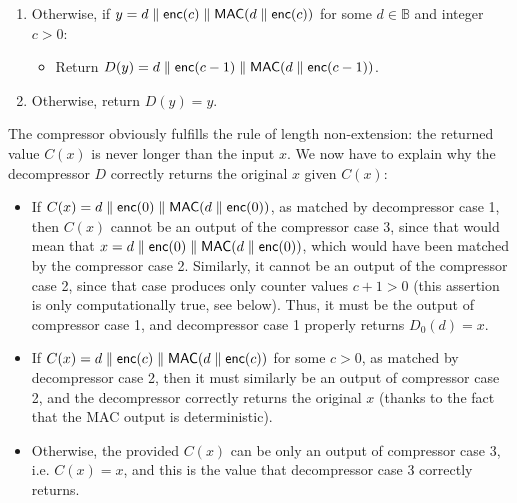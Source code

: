 \documentclass{llncs}
\newcommand{\bB}{\mathbb{B}}
\newcommand{\MAC}{\text{\textsf{MAC}}}
\newcommand{\cc}{\text{\textsf{enc}}}
\begin{document}
{\begin{minipage}{\textwidth - 8.2pt}
\begin{enumerate}
    \item Otherwise, if $y = d \parallel \cc(c) \parallel \MAC(d \parallel \cc(c))$ for some $d \in \bB$ and integer $c > 0$:
    \begin{itemize}
        \item Return $D(y) = d \parallel \cc(c-1) \parallel \MAC(d \parallel \cc(c-1))$.
    \end{itemize}

    \item Otherwise, return $D(y) = y$.
\end{enumerate}

\end{minipage}}
\vspace{2ex}

The compressor obviously fulfills the rule of length non-extension:
the returned value $C(x)$ is never longer than the input $x$. We now have
to explain why the decompressor $D$ correctly returns the original $x$
given $C(x)$:
\begin{itemize}

    \item If $C(x) = d \parallel \cc(0) \parallel \MAC(d \parallel
    \cc(0))$, as matched by decompressor case 1, then $C(x)$ cannot be
    an output of the compressor case 3, since that would mean that $x =
    d \parallel \cc(0) \parallel \MAC(d \parallel \cc(0))$, which would
    have been matched by the compressor case 2. Similarly, it cannot be
    an output of the compressor case 2, since that case produces only
    counter values $c+1 > 0$ (this assertion is only computationally
    true, see below). Thus, it must be the output of compressor case 1,
    and decompressor case 1 properly returns $D_0(d) = x$.

    \item If $C(x) = d \parallel \cc(c) \parallel \MAC(d \parallel \cc(c))$
    for some $c > 0$, as matched by decompressor case 2, then it must
    similarly be an output of compressor case 2, and the decompressor
    correctly returns the original $x$ (thanks to the fact that the MAC
    output is deterministic).

    \item Otherwise, the provided $C(x)$ can be only an output of
    compressor case 3, i.e. $C(x) = x$, and this is the value that
    decompressor case 3 correctly returns.

\end{itemize}
\end{document}
